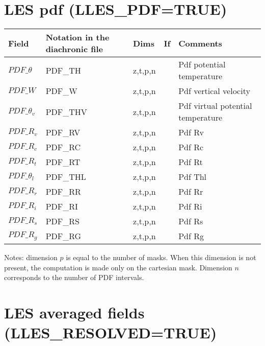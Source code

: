 \section{LES pdf (LLES\_PDF=TRUE)}

\begin{longtable}[c]{|p{}|p{}|p{}|p{}|p{}|}
\hline
Field & Notation in the diachronic file & Dims & If  & Comments \\
\hline \hline
\endhead
$PDF\_\theta$   & PDF\_TH  & z,t,p,n &   & Pdf potential temperature \\\hline
$PDF\_W$        & PDF\_W   & z,t,p,n &   & Pdf vertical velocity \\\hline
$PDF\_\theta_v$ & PDF\_THV & z,t,p,n &   & Pdf virtual potential temperature \\\hline
$PDF\_R_v$      & PDF\_RV  & z,t,p,n &   & Pdf Rv \\\hline
$PDF\_R_c$      & PDF\_RC  & z,t,p,n &   & Pdf Rc \\\hline
$PDF\_R_t$      & PDF\_RT  & z,t,p,n &   & Pdf Rt \\\hline
$PDF\_\theta_l$ & PDF\_THL & z,t,p,n &   & Pdf Thl \\\hline
$PDF\_R_r$      & PDF\_RR  & z,t,p,n &   & Pdf Rr \\\hline
$PDF\_R_i$      & PDF\_RI  & z,t,p,n &   & Pdf Ri \\\hline
$PDF\_R_s$      & PDF\_RS  & z,t,p,n &   & Pdf Rs \\\hline
$PDF\_R_g$      & PDF\_RG  & z,t,p,n &   & Pdf Rg\\\hline
\end{longtable}

Notes: dimension $p$ is equal to the number of masks. When this dimension is not present, the computation is made only on the cartesian mask. Dimension $n$ corresponds to the number of PDF intervals.


\section{LES averaged fields (LLES\_RESOLVED=TRUE)}

